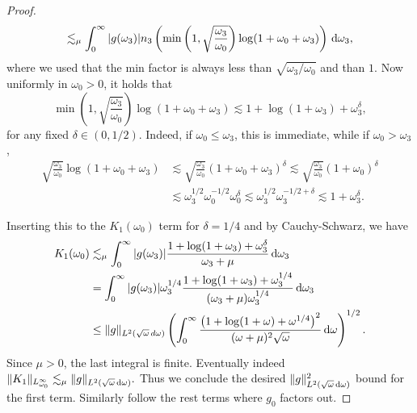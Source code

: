 \documentclass[reqno,11pt,letterpaper]{amsart}
\numberwithin{equation}{section}
\newcommand{\dd}{\, {\rm d}}
\begin{document}
\begin{proof}
\begin{align*}
\lesssim_\mu 
\int_0^\infty |g(\omega_3)|n_3 
\left(
\min\left(1,\sqrt{\frac{\omega_3}{\omega_0}}\right)
\log(1+\omega_0+\omega_3)
\right) \dd \omega_3, 
\end{align*}
where we used that the min factor is always less than $\sqrt{\omega_3/\omega_0}$ and than $1$. 
Now uniformly in $\omega_0>0$, it holds that 
$$\min\left(1,\sqrt{\frac{\omega_3}{\omega_0}}\right)
\log(1+\omega_0+\omega_3)
\lesssim
1+\log(1+\omega_3) +\omega_3^{\delta},$$ 
for any fixed $\delta \in (0,1/2)$. 
Indeed, if $\omega_0 \le \omega_3$, this is immediate, while if
$\omega_0>\omega_3$, 
\begin{align*}
\sqrt{\frac{\omega_3}{\omega_0}}
\log(1+\omega_0+\omega_3)& \lesssim \sqrt{\frac{\omega_3}{\omega_0}} (1+\omega_0+\omega_3)^{\delta}\lesssim \sqrt{\frac{\omega_3}{\omega_0}}  (1+\omega_0)^{\delta}\\
&\lesssim \omega_3^{1/2}\omega_0^{-1/2} \omega_0^{\delta} \lesssim \omega_3^{1/2} \omega_3^{-1/2+\delta} \lesssim 1+ \omega_3^\delta. 
\end{align*}

Inserting this to the $K_1(\omega_0)$ term for $\delta=1/4$ and by Cauchy-Schwarz, we have
\begin{align*}
K_1(\omega_0)
&\lesssim_\mu
\int_0^\infty
|g(\omega_3)|
\frac{1+\log(1+\omega_3)+\omega_3^{\delta}}
{\omega_3+\mu}\dd \omega_3\\
&=
\int_0^\infty
|g(\omega_3)|\omega_3^{1/4}
\frac{1+\log(1+\omega_3)+\omega_3^{1/4}}
{(\omega_3+\mu)\omega_3^{1/4}}
\dd\omega_3
\\
&\le
\|g\|_{L^2(\sqrt{\omega}\,d\omega)}
\left(
\int_0^\infty
\frac{
\left(1+\log(1+\omega)+\omega^{1/4}\right)^2
}
{(\omega+\mu)^2\sqrt{\omega}}
\dd \omega
\right)^{1/2}.
\end{align*}
Since $\mu>0$, the last integral is finite. Eventually indeed 
$
\|K_1\|_{L^\infty_{\omega_0}}
\lesssim_\mu
\|g\|_{L^2(\sqrt{\omega}\dd\omega)}.$
Thus we conclude the desired $\|g\|_{L^2(\sqrt{\omega}\dd\omega)}^2$ bound for the first term. Similarly follow the rest terms where $g_0$ factors out.  


\end{proof}
\end{document}
